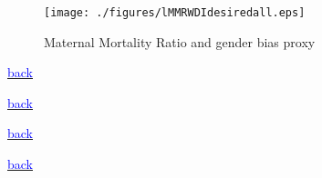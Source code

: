 \documentclass[10pt,letterpaper,subeqn]{beamer}
\begin{document}
\begin{frame}[label=MMRBias,plain]
\begin{figure}
\caption{Maternal Mortality Ratio and gender bias proxy}
\texttt{[image: ./figures/lMMRWDIdesiredall.eps]}
\end{figure}
\vspace{-8mm}
{\footnotesize \hyperlink{CC1}{\textcolor{blue}{back}}}
\end{frame}



\begin{frame}[label=placebo1]

{\footnotesize \hyperlink{placebos}{\textcolor{blue}{back}}}
\end{frame}

\begin{frame}[label=placebo2]

{\footnotesize \hyperlink{placebos}{\textcolor{blue}{back}}}
\end{frame}

\begin{frame}[plain,label=placebo3]

{\footnotesize \hyperlink{placebos}{\textcolor{blue}{back}}}
\end{frame}
\end{document}
